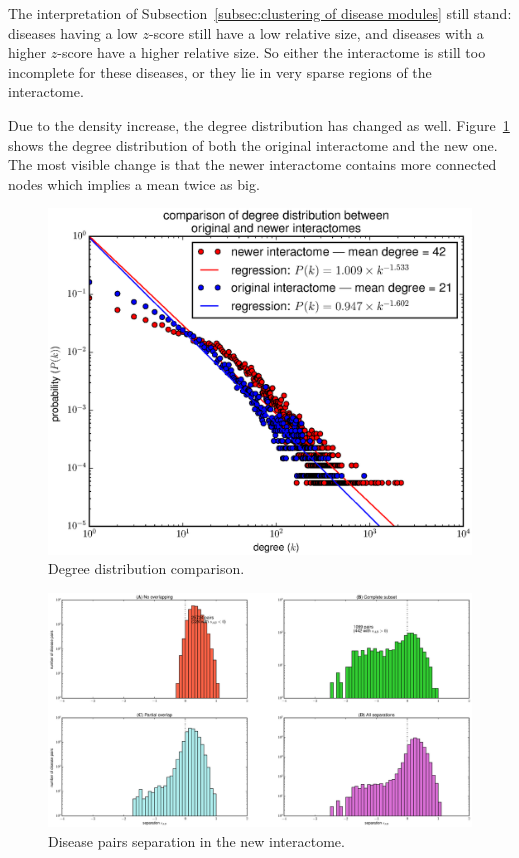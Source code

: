 \documentclass[letterpaper]{article}
\begin{document}
	The interpretation of Subsection~\ref{subsec:clustering of disease modules} still stand: diseases having a low $z$-score still
	have a low relative size, and diseases with a higher $z$-score have a higher relative size. So either the interactome is still
	too incomplete for these diseases, or they lie in very sparse regions of the interactome.

	Due to the density increase, the degree distribution has changed as well. Figure~\ref{fig:degree distribution comparison}
	shows the degree distribution of both the original interactome and the new one. The most visible change is that the newer
	interactome contains more connected nodes which implies a mean twice as big.

	\begin{figure}[!h]
		\includegraphics[width=.5\textwidth]{images/degree_distributions_comparison.eps}
		\caption{Degree distribution comparison.\label{fig:degree distribution comparison}}
	\end{figure}

	\begin{figure}%
		\hspace{-1.8cm}
		\vspace{-1cm}
		\includegraphics[scale=.35]{images/new_interactome_s_AB_histogram.eps}
		\caption{Disease pairs separation in the new interactome.\label{fig:new interactome s_AB}}
	\end{figure}
\end{document}
